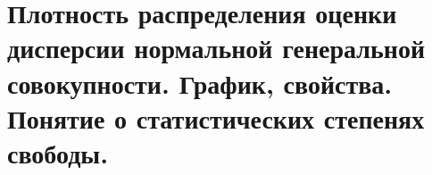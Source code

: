 \documentclass[polytech/stats/exam-2023/stats-exam-2023.tex]{subfiles}
\begin{document}
\section{Плотность распределения оценки дисперсии нормальной генеральной совокупности. График, свойства. Понятие о статистических степенях свободы.}
\end{document}
